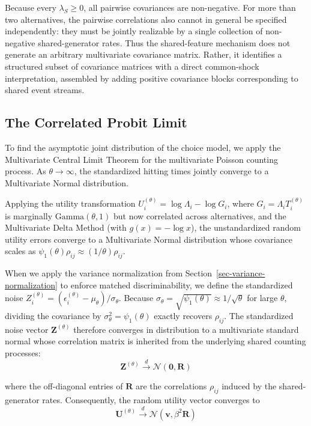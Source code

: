 \documentclass[
  man,
  floatsintext,
  longtable,
  a4paper,
  nolmodern,
  notxfonts,
  notimes,
  colorlinks=true,linkcolor=blue,citecolor=blue,urlcolor=blue]{apa7}
\begin{document}
Because every \(\lambda_S \ge 0\), all pairwise covariances are
non-negative. For more than two alternatives, the pairwise correlations
also cannot in general be specified independently: they must be jointly
realizable by a single collection of non-negative shared-generator
rates. Thus the shared-feature mechanism does not generate an arbitrary
multivariate covariance matrix. Rather, it identifies a structured
subset of covariance matrices with a direct common-shock interpretation,
assembled by adding positive covariance blocks corresponding to shared
event streams.

\subsection{The Correlated Probit
Limit}\label{the-correlated-probit-limit}

To find the asymptotic joint distribution of the choice model, we apply
the Multivariate Central Limit Theorem for the multivariate Poisson
counting process. As \(\theta \to \infty\), the standardized hitting
times jointly converge to a Multivariate Normal distribution.

Applying the utility transformation
\(U_i^{(\theta)} = \log \Lambda_i - \log G_i\), where
\(G_i = \Lambda_i T_i^{(\theta)}\) is marginally
\(\text{Gamma}(\theta, 1)\) but now correlated across alternatives, and
the Multivariate Delta Method (with \(g(x) = -\log x\)), the
unstandardized random utility errors converge to a Multivariate Normal
distribution whose covariance scales as
\(\psi_1(\theta) \rho_{ij} \approx (1/\theta)\rho_{ij}\).

When we apply the variance normalization from
Section~\ref{sec-variance-normalization} to enforce matched
discriminability, we define the standardized noise
\(Z_i^{(\theta)} = (\epsilon_i^{(\theta)} - \mu_\theta) / \sigma_\theta\).
Because
\(\sigma_\theta = \sqrt{\psi_1(\theta)} \approx 1/\sqrt{\theta}\) for
large \(\theta\), dividing the covariance by
\(\sigma_\theta^2 = \psi_1(\theta)\) exactly recovers \(\rho_{ij}\). The
standardized noise vector \(\mathbf{Z}^{(\theta)}\) therefore converges
in distribution to a multivariate standard normal whose correlation
matrix is inherited from the underlying shared counting processes: \[
\mathbf{Z}^{(\theta)} \xrightarrow{d} \mathcal{N}(\mathbf{0}, \mathbf{R})
\]

where the off-diagonal entries of \(\mathbf{R}\) are the correlations
\(\rho_{ij}\) induced by the shared-generator rates. Consequently, the
random utility vector converges to \[
\mathbf{U}^{(\theta)} \xrightarrow{d} \mathcal{N}(\mathbf{v}, \beta^2 \mathbf{R})
\]
\end{document}
